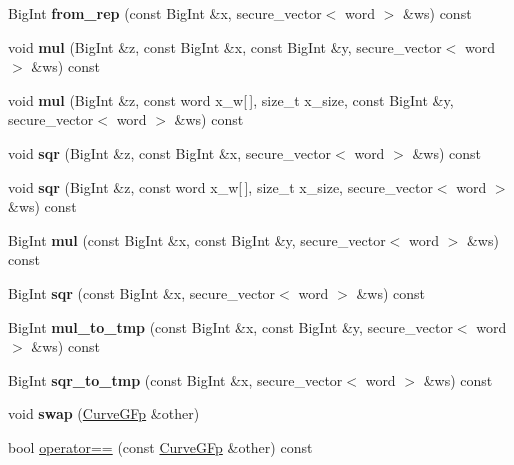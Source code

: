 \begin{DoxyCompactItemize}
Big\+Int {\bfseries from\+\_\+rep} (const Big\+Int \&x, secure\+\_\+vector$<$ word $>$ \&ws) const
\item 
\mbox{\label{class_botan_1_1_curve_g_fp_a1d4eac437417358cec57881e6233a5b1}} 
void {\bfseries mul} (Big\+Int \&z, const Big\+Int \&x, const Big\+Int \&y, secure\+\_\+vector$<$ word $>$ \&ws) const
\item 
\mbox{\label{class_botan_1_1_curve_g_fp_a1f5864273be0c7140752ffb663599ef1}} 
void {\bfseries mul} (Big\+Int \&z, const word x\+\_\+w\mbox{[}$\,$\mbox{]}, size\+\_\+t x\+\_\+size, const Big\+Int \&y, secure\+\_\+vector$<$ word $>$ \&ws) const
\item 
\mbox{\label{class_botan_1_1_curve_g_fp_a53633c7d5a122beeb441493ae2212095}} 
void {\bfseries sqr} (Big\+Int \&z, const Big\+Int \&x, secure\+\_\+vector$<$ word $>$ \&ws) const
\item 
\mbox{\label{class_botan_1_1_curve_g_fp_a9aae7d8b28571d726bc8dace6fd60ea5}} 
void {\bfseries sqr} (Big\+Int \&z, const word x\+\_\+w\mbox{[}$\,$\mbox{]}, size\+\_\+t x\+\_\+size, secure\+\_\+vector$<$ word $>$ \&ws) const
\item 
\mbox{\label{class_botan_1_1_curve_g_fp_abb039814d0af92ff1c1ddc9c42735bb4}} 
Big\+Int {\bfseries mul} (const Big\+Int \&x, const Big\+Int \&y, secure\+\_\+vector$<$ word $>$ \&ws) const
\item 
\mbox{\label{class_botan_1_1_curve_g_fp_add9d5289bb5778a5049ddf8f3106f3ff}} 
Big\+Int {\bfseries sqr} (const Big\+Int \&x, secure\+\_\+vector$<$ word $>$ \&ws) const
\item 
\mbox{\label{class_botan_1_1_curve_g_fp_af745003fff56cc3530c44189b65f22fb}} 
Big\+Int {\bfseries mul\+\_\+to\+\_\+tmp} (const Big\+Int \&x, const Big\+Int \&y, secure\+\_\+vector$<$ word $>$ \&ws) const
\item 
\mbox{\label{class_botan_1_1_curve_g_fp_ac98411eb77d69b2e2aa7da14f5522ba5}} 
Big\+Int {\bfseries sqr\+\_\+to\+\_\+tmp} (const Big\+Int \&x, secure\+\_\+vector$<$ word $>$ \&ws) const
\item 
\mbox{\label{class_botan_1_1_curve_g_fp_a58953b2563d8c6a59cd146820a83b13e}} 
void {\bfseries swap} (\hyperlink{class_botan_1_1_curve_g_fp}{Curve\+G\+Fp} \&other)
\item 
bool \hyperlink{class_botan_1_1_curve_g_fp_adf896804903ce76835069b5d51aeb161}{operator==} (const \hyperlink{class_botan_1_1_curve_g_fp}{Curve\+G\+Fp} \&other) const
\end{DoxyCompactItemize}



